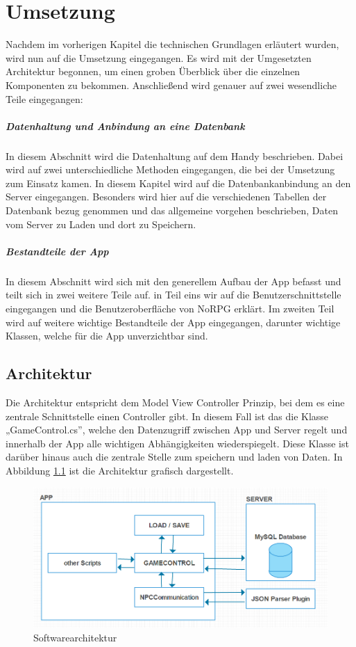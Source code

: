\chapter{Umsetzung}
	Nachdem im vorherigen Kapitel die technischen Grundlagen erläutert wurden, wird nun auf die Umsetzung eingegangen. Es wird mit der Umgesetzten Architektur begonnen, um einen groben Überblick über die einzelnen Komponenten zu bekommen. Anschließend wird genauer auf zwei wesendliche Teile eingegangen:
	
\paragraph{Datenhaltung und Anbindung an eine Datenbank}
	In diesem Abschnitt wird die Datenhaltung auf dem Handy beschrieben. Dabei wird auf zwei unterschiedliche Methoden eingegangen, die bei der Umsetzung zum Einsatz kamen.
	In diesem Kapitel wird auf die Datenbankanbindung an den Server eingegangen. Besonders wird hier auf die verschiedenen Tabellen der Datenbank bezug genommen und das allgemeine vorgehen beschrieben, Daten vom Server zu Laden und dort zu Speichern.
		
\paragraph{Bestandteile der App}
	In diesem Abschnitt wird sich mit den generellem Aufbau der App befasst und teilt sich in zwei weitere Teile auf. in Teil eins wir auf die Benutzerschnittstelle eingegangen und die Benutzeroberfläche von NoRPG erklärt. Im zweiten Teil wird auf weitere wichtige Bestandteile der App eingegangen, darunter wichtige Klassen, welche für die App unverzichtbar sind.
	
\section{Architektur}
	Die Architektur entspricht dem Model View Controller Prinzip, bei dem es eine zentrale Schnittstelle einen Controller gibt. In diesem Fall ist das die Klasse „GameControl.cs”, welche den Datenzugriff  zwischen App und Server regelt und innerhalb der App alle wichtigen Abhängigkeiten wiederspiegelt. Diese Klasse ist darüber hinaus auch die zentrale Stelle zum speichern und laden von Daten. In Abbildung \ref{architecture} ist die Architektur grafisch dargestellt.

	\begin{figure}[htbp]
		\centering 
		\label{architecture}
		\includegraphics[width=13cm]{pics/archtecture.png}
		\caption{Softwarearchitektur}
	\end{figure}	
			
